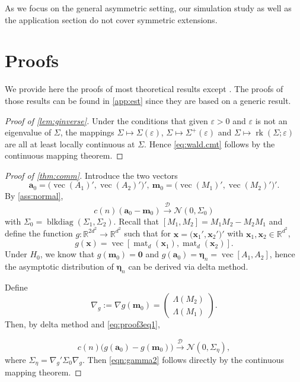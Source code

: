 \documentclass[12pt]{article}
\numberwithin{equation}{section}
\numberwithin{table}{section}
\numberwithin{thm}{section}
\numberwithin{defn}{section}
\numberwithin{lem}{section}
\numberwithin{prop}{section}
\numberwithin{cor}{section}
\numberwithin{rem}{section}
\DeclareMathOperator{\Vector}{vec}
\DeclareMathOperator{\blkdiag}{blkdiag}
\DeclareMathOperator{\mat}{mat}
\newcommand{\rank}{\operatorname{rk}}
\begin{document}
\begin{appendix}
As we focus on the general asymmetric setting, our simulation study as well as the application section do not cover symmetric extensions.


\section{Proofs}\label{app:profs}

We provide here the proofs of most theoretical results except . The proofs of those results can be found in \autoref{app:est} since they are based on a generic result.

\begin{proof}[Proof of \autoref{lem:ginverse}]
Under the conditions that given $\varepsilon > 0$ and $\varepsilon$ is not an eigenvalue of $\Sigma$, the mappings $\Sigma \mapsto \Sigma(\varepsilon)$, $\Sigma \mapsto \Sigma^+(\varepsilon)$ and $\Sigma \mapsto \rank(\Sigma; \varepsilon)$ are all at least locally continuous at $\Sigma$. Hence \eqref{eq:wald.cmt} follows by the continuous mapping theorem.
\end{proof}

\begin{proof}[Proof of \autoref{thm:comm}] \label{app:prop1}
Introduce the two vectors
$$
\bm{a}_0 = \big(\Vector(A_1)', \Vector(A_2)'\big)', ~ \bm{m}_0 = \big(\Vector(M_1)', \Vector(M_2)'\big)'.
$$
By \autoref{ass:normal},
\begin{equation} \label{eq:proof3eq1}
c(n) (\bm{a}_0 - \bm{m}_0) \xrightarrow{\mathcal{D}} \mathcal{N}(0, \Sigma_0)
\end{equation}
with $\Sigma_0 = \blkdiag(\Sigma_1, \Sigma_2)$. Recall that $[M_{1},M_{2} ]= M_{1}M_{2}-M_{2}M_{1}$ and define the function $g: \mathbb{R}^{2d^2} \to \mathbb{R}^{d^2}$ such that for $\bm{x} = \big(\bm{x}_1', \bm{x}_2'\big)'$ with $\bm{x}_1, \bm{x}_2 \in \mathbb{R}^{d^2}$,
$$
g(\bm{x}) = \Vector[\mat_d(\bm{x}_1), \mat_d(\bm{x}_2)].
$$
Under $H_0$, we know that $g(\bm{m}_0) = \bm{0}$ and $g(\bm{a}_0) = \bm{\eta}_n = \Vector[A_{1},A_{2} ]$, hence the asymptotic distribution of $\bm{\eta}_n$ can be derived via delta method.

Define
$$
\nabla_g := \nabla g(\bm{m}_0) = \begin{pmatrix}\Lambda(M_2)\\ \Lambda(M_1)\end{pmatrix}.
$$
Then, by delta method and \eqref{eq:proof3eq1},

$$
c(n) \big( g(\bm{a}_0) - g(\bm{m}_0) \big) \xrightarrow{\mathcal{D}} \mathcal{N}(0, \Sigma_\eta),
$$
where $\Sigma_\eta = \nabla_g' \Sigma_0 \nabla_g$. Then \eqref{eqn:gamma2} follows directly by the continuous mapping theorem.
\end{proof}


\end{appendix}
\end{document}
